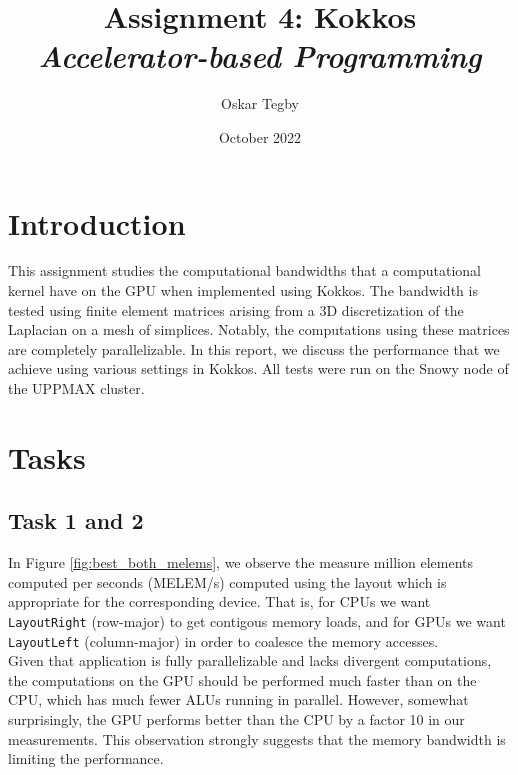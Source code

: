 \documentclass[10pt]{article}
\title{Assignment 4: Kokkos \\ \large \textit{Accelerator-based Programming}}
\author{Oskar Tegby}
\date{October 2022}
\begin{document}
\maketitle


\section{Introduction}
This assignment studies the computational bandwidths that a computational kernel have on the GPU when implemented using Kokkos. The bandwidth is tested using finite element matrices arising from a 3D discretization of the Laplacian on a mesh of simplices. Notably, the computations using these matrices are completely parallelizable. In this report, we discuss the performance that we achieve using various settings in Kokkos. All tests were run on the Snowy node of the UPPMAX cluster.
\section{Tasks}
\subsection{Task 1 and 2}
In Figure \ref{fig:best_both_melems}, we observe the measure million elements computed per seconds (MELEM/s) computed using the layout which is appropriate for the corresponding device. That is, for CPUs we want \texttt{LayoutRight} (row-major) to get contigous memory loads, and for GPUs we want \texttt{LayoutLeft} (column-major) in order to coalesce the memory accesses. \\

Given that application is fully parallelizable and lacks divergent computations, the computations on the GPU should be performed much faster than on the CPU, which has much fewer ALUs running in parallel. However, somewhat surprisingly, the GPU performs better than the CPU by a factor 10 in our measurements. This observation strongly suggests that the memory bandwidth is limiting the performance. \\
\end{document}
